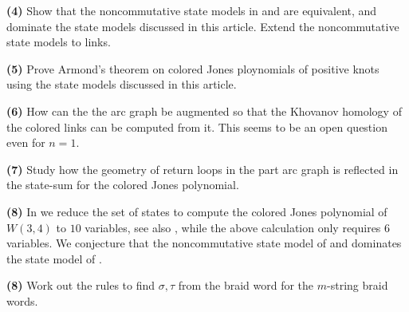 \documentclass[11pt]{article}
\theoremstyle{definition}
\theoremstyle{remark}
\theoremstyle{remark}
\begin{document}
\noindent \textbf{(4)} Show that the noncommutative state models in \cite{GL} and \cite{HL} are equivalent, and dominate the state models discussed in this article. Extend the noncommutative state models to links. 

\noindent \textbf{(5)} Prove Armond's theorem on colored Jones ploynomials of positive knots using the state models discussed in this article. 

\noindent \textbf{(6)} How can the the arc graph be augmented so that the Khovanov homology of the colored links can be computed from it. This seems to be an open question even for $n=1$.

\noindent \textbf{(7)} Study how the geometry of return loops in the part arc graph is reflected in the state-sum for the colored Jones polynomial. 

\noindent \textbf{(8)} In \cite{KM} we reduce the set of states to compute the colored Jones polynomial of $W(3,4)$ to $10$ variables, see also \cite{A}, while the above calculation only requires $6$ variables. We conjecture that the noncommutative state model of \cite{HL} and \cite{A} dominates the state model of \cite{GL}.

\noindent \textbf{(8)} Work out the rules to find $\sigma ,\tau $ from the braid word for the $m$-string braid words. 
\end{document}
